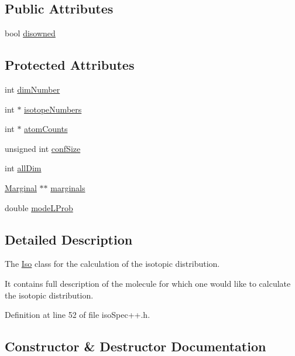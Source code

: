 \subsection*{Public Attributes}
\begin{DoxyCompactItemize}
\item 
bool \mbox{\hyperlink{class_iso_spec_1_1_iso_ad2a353f2c746648b08a9ad31ff775766}{disowned}}
\end{DoxyCompactItemize}
\subsection*{Protected Attributes}
\begin{DoxyCompactItemize}
\item 
int \mbox{\hyperlink{class_iso_spec_1_1_iso_a90245f9bc318f12720c134f61bbe0db0}{dim\+Number}}
\item 
int $\ast$ \mbox{\hyperlink{class_iso_spec_1_1_iso_a7235f0afc56dccd13937791a630c45da}{isotope\+Numbers}}
\item 
int $\ast$ \mbox{\hyperlink{class_iso_spec_1_1_iso_ab01939334b6c3e69f65a36f9965971a2}{atom\+Counts}}
\item 
unsigned int \mbox{\hyperlink{class_iso_spec_1_1_iso_a89ed144bf2495fa25840aca90a31b425}{conf\+Size}}
\item 
int \mbox{\hyperlink{class_iso_spec_1_1_iso_a8dd2c443706935b582979b13f935115c}{all\+Dim}}
\item 
\mbox{\hyperlink{class_iso_spec_1_1_marginal}{Marginal}} $\ast$$\ast$ \mbox{\hyperlink{class_iso_spec_1_1_iso_aea98a8331a2f8a1a6bbcace6124fcfae}{marginals}}
\item 
double \mbox{\hyperlink{class_iso_spec_1_1_iso_ab51c157b23ae6a6b521667b6f0e8a208}{mode\+L\+Prob}}
\end{DoxyCompactItemize}


\subsection{Detailed Description}
The \mbox{\hyperlink{class_iso_spec_1_1_iso}{Iso}} class for the calculation of the isotopic distribution. 

It contains full description of the molecule for which one would like to calculate the isotopic distribution. 

Definition at line 52 of file iso\+Spec++.\+h.



\subsection{Constructor \& Destructor Documentation}
\mbox{\label{class_iso_spec_1_1_iso_a5ff1fafd079a866e9d61bc7d859842ea}} 
